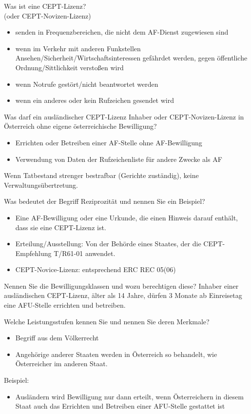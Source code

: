 \documentclass[avery5371,grid,frame,a4paper]{flashcards}
\newcommand{\card}[3]{
  \begin{flashcard}[{\chap} -- #1]{#2}#3\end{flashcard}
}
\begin{document}
\card{39}{Was ist eine CEPT-Lizenz? \\ (oder CEPT-Novizen-Lizenz)}{\begin{itemize}\itemsep0pt \item senden in Frequenzbereichen, die nicht dem AF-Dienst zugewiesen sind \item wenn im Verkehr mit anderen Funkstellen Ansehen/Sicherheit/Wirtschaftsinteressen gefährdet werden, gegen öffentliche Ordnung/Sittlichkeit verstoßen wird \item wenn Notrufe gestört/nicht beantwortet werden \item wenn ein anderes oder kein Rufzeichen gesendet wird\end{itemize}}

\card{40}{Was darf ein ausländischer CEPT-Lizenz Inhaber oder CEPT-Novizen-Lizenz in Österreich ohne eigene österreichische Bewilligung?}{\begin{itemize}\itemsep1pt \item Errichten oder Betreiben einer AF-Stelle ohne AF-Bewilligung \item Verwendung von Daten der Rufzeichenliste für andere Zwecke als AF \end{itemize} Wenn Tatbestand strenger bestrafbar
(Gerichte zuständig), keine Verwaltungsübertretung.}

\card{41}{Was bedeutet der Begriff Reziprozität und nennen Sie ein Beispiel?}{\begin{itemize}\itemsep1pt \item Eine AF-Bewilligung oder eine Urkunde, die einen Hinweis darauf enthält, dass sie eine CEPT-Lizenz ist. \item Erteilung/Ausstellung: Von der Behörde eines Staates, der die CEPT-Empfehlung T/R61-01 anwendet. \item CEPT-Novice-Lizenz: entsprechend ERC
REC 05(06)\end{itemize}}

\card{42}{Nennen Sie die Bewilligungsklassen und wozu berechtigen diese?}{ Inhaber einer ausländischen CEPT-Lizenz, älter als 14 Jahre, dürfen 3 Monate ab Einreisetag eine AFU-Stelle errichten und betreiben.}

\card{43}{Welche Leistungsstufen kennen Sie und nennen Sie deren Merkmale?}{\begin{itemize}\itemsep1pt \item Begriff aus dem Völkerrecht \item Angehörige anderer Staaten werden in
Österreich so behandelt, wie Österreicher im anderen Staat. \end{itemize}
Beispiel: \begin{itemize}\itemsep1pt \item Ausländern wird Bewilligung nur dann erteilt, wenn Österreichern in diesem Staat auch das Errichten und Betreiben einer AFU-Stelle gestattet ist \end{itemize}}
\end{document}
